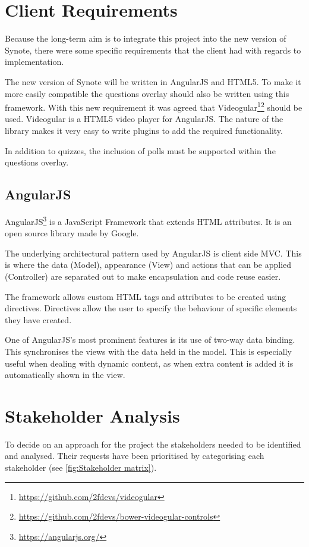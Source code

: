 \section{Client Requirements}
Because the long-term aim is to integrate this project into the new version of Synote, there were some specific requirements that the client had with regards to implementation.

The new version of Synote will be written in \gls{AngularJS} and \gls{HTML5}. To make it more easily compatible the questions overlay should also be written using this framework. With this new requirement it was agreed that \gls{Videogular}\footnote{\url{https://github.com/2fdevs/videogular}}\footnote{\url{https://github.com/2fdevs/bower-videogular-controls}} should be used. \gls{Videogular} is a \gls{HTML5} video player for \gls{AngularJS}. The nature of the library makes it very easy to write plugins to add the required functionality.

In addition to quizzes, the inclusion of polls must be supported within the questions overlay.

\subsection{AngularJS}
\label{Section:AngularJS}

\gls{AngularJS}\footnote{\url{https://angularjs.org/}} is a JavaScript Framework that extends HTML attributes. It is an open source library made by Google.

The underlying architectural pattern used by \gls{AngularJS} is client side \gls{MVC}. This is where the data (Model), appearance (View) and actions that can be applied (Controller) are separated out to make encapsulation and code reuse easier.

The framework allows custom HTML tags and attributes to be created using directives. Directives allow the user to specify the behaviour of specific elements they have created.

One of \gls{AngularJS}'s most prominent features is its use of two-way data binding. This synchronises the views with the data held in the model. This is especially useful when dealing with dynamic content, as when extra content is added it is automatically shown in the view.

\section{Stakeholder Analysis}
To decide on an approach for the project the stakeholders needed to be identified and analysed. Their requests have been prioritised by categorising each stakeholder (see \autoref{fig:Stakeholder matrix}).

